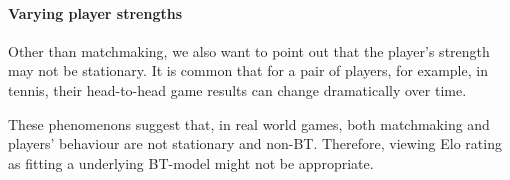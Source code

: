 \paragraph{Varying player strengths} Other than matchmaking, we also want to point out that the player's strength may not be stationary. It is common that for a pair of players, for example, in tennis, their head-to-head game results can change dramatically over time. 

These phenomenons suggest that, in real world games, both matchmaking and players' behaviour are not stationary and non-BT. Therefore, viewing Elo rating as fitting a underlying BT-model might not be appropriate.

